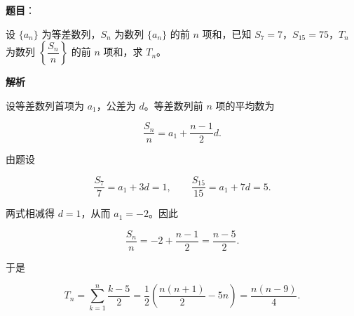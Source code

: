 \begin{answer}

\textbf{题目}：

设 $\{a_n\}$ 为等差数列，$S_n$ 为数列 $\{a_n\}$ 的前 $n$ 项和，已知 $S_7=7$，$S_{15}=75$，$T_n$ 为数列 $\left\{\dfrac{S_n}{n}\right\}$ 的前 $n$ 项和，求 $T_n$。

\textbf{解析}

设等差数列首项为 $a_1$，公差为 $d$。等差数列前 $n$ 项的平均数为

\nopagebreak[4]
\[
\frac{S_n}{n}=a_1+\frac{n-1}{2}d.
\]

由题设

\nopagebreak[4]
\[
\frac{S_7}{7}=a_1+3d=1,
\qquad
\frac{S_{15}}{15}=a_1+7d=5.
\]

两式相减得 $d=1$，从而 $a_1=-2$。因此

\nopagebreak[4]
\[
\frac{S_n}{n}=-2+\frac{n-1}{2}=\frac{n-5}{2}.
\]

于是

\nopagebreak[4]
\[
T_n=\sum_{k=1}^n\frac{k-5}{2}
=\frac12\left(\frac{n(n+1)}2-5n\right)
=\frac{n(n-9)}4.
\]


\end{answer}
